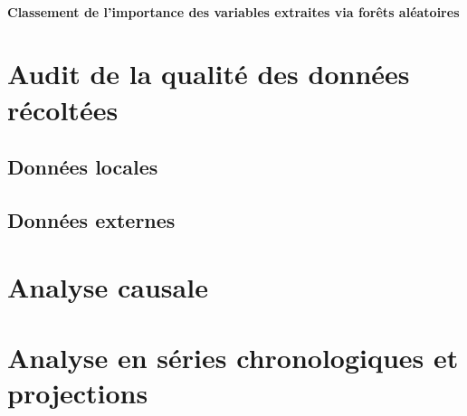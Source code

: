 	\paragraph{Classement de l'importance des variables extraites via forêts aléatoires}
	\section{Audit de la qualité des données récoltées}
	\subsection{Données locales}
	\subsection{Données externes}
	\section{Analyse causale}
	\section{Analyse en séries chronologiques et projections}